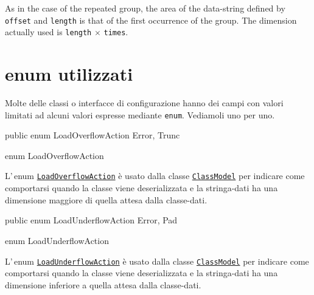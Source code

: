 \documentclass[a4paper,10pt]{report}
\newif\ifesource
\newenvironment{elisting}[1][H]
  {\captionsetup{aboveskip=0pt}\begin{listing}[#1]}
  {\end{listing}%
}
\begin{document}
As in the case of the repeated group, the area of the data-string defined by 
\verb!offset! and \verb!length! is that of the first occurrence of the group. 
The dimension actually used is \verb!length! $\times$ \verb!times!.

\vspace*{5cm}

\chapter{enum utilizzati}
Molte delle classi o interfacce di configurazione hanno dei campi con valori
limitati ad alcuni valori espresse mediante \texttt{enum}.
Vediamoli uno per uno.

\ifesource
\begin{lstlisting}[language=java, 
caption=enum LoadOverflowAction, 
label=lst:LoadOverflowAction]
public enum LoadOverflowAction { Error, Trunc }
\end{lstlisting}\index{LoadOverflowAction}
\else
\begin{elisting}
\begin{javacode}
public enum LoadOverflowAction { Error, Trunc }
\end{javacode}
\caption{enum LoadOverflowAction}\label{lst:LoadOverflowAction}
\end{elisting}
\fi
L'\,enum \hyperref[lst:LoadOverflowAction]{\texttt{LoadOverflowAction}} è usato 
dalla classe \hyperref[lst:ClassModel]{\texttt{ClassModel}} per indicare come 
comportarsi quando la classe viene deserializzata e la stringa-dati ha una 
dimensione maggiore di quella attesa dalla classe-dati.

\ifesource
\begin{lstlisting}[language=java, 
caption=enum LoadUnderflowAction, 
label=lst:LoadUnderflowAction]
public enum LoadUnderflowAction { Error, Pad }
\end{lstlisting}\index{LoadUnderflowAction}
\else
\begin{elisting}
\begin{javacode}
public enum LoadUnderflowAction { Error, Pad }
\end{javacode}
\caption{enum LoadUnderflowAction}\label{lst:LoadUnderflowAction}
\end{elisting}
\fi
L'\,enum \hyperref[lst:LoadUnderflowAction]{\texttt{LoadUnderflowAction}} è 
usato dalla classe \hyperref[lst:ClassModel]{\texttt{ClassModel}} per indicare 
come comportarsi quando la classe viene deserializzata e la stringa-dati ha una 
dimensione inferiore a quella attesa dalla classe-dati.
\end{document}
